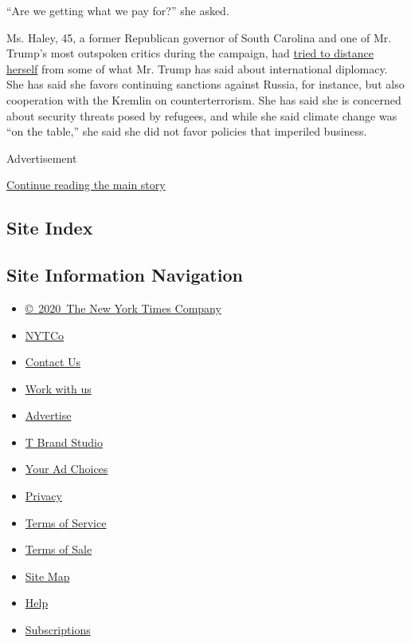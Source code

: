 ``Are we getting what we pay for?'' she asked.

Ms. Haley, 45, a former Republican governor of South Carolina and one of
Mr. Trump's most outspoken critics during the campaign, had
\href{https://www.nytimes.com/2017/01/18/us/politics/nikki-haley-un-ambassador-russia-war-crime.html}{tried
to distance herself} from some of what Mr. Trump has said about
international diplomacy. She has said she favors continuing sanctions
against Russia, for instance, but also cooperation with the Kremlin on
counterterrorism. She has said she is concerned about security threats
posed by refugees, and while she said climate change was ``on the
table,'' she said she did not favor policies that imperiled business.

Advertisement

\protect\hyperlink{after-bottom}{Continue reading the main story}

\hypertarget{site-index}{%
\subsection{Site Index}\label{site-index}}

\hypertarget{site-information-navigation}{%
\subsection{Site Information
Navigation}\label{site-information-navigation}}

\begin{itemize}
\tightlist
\item
  \href{https://help.nytimes.com/hc/en-us/articles/115014792127-Copyright-notice}{©~2020~The
  New York Times Company}
\end{itemize}

\begin{itemize}
\tightlist
\item
  \href{https://www.nytco.com/}{NYTCo}
\item
  \href{https://help.nytimes.com/hc/en-us/articles/115015385887-Contact-Us}{Contact
  Us}
\item
  \href{https://www.nytco.com/careers/}{Work with us}
\item
  \href{https://nytmediakit.com/}{Advertise}
\item
  \href{http://www.tbrandstudio.com/}{T Brand Studio}
\item
  \href{https://www.nytimes.com/privacy/cookie-policy\#how-do-i-manage-trackers}{Your
  Ad Choices}
\item
  \href{https://www.nytimes.com/privacy}{Privacy}
\item
  \href{https://help.nytimes.com/hc/en-us/articles/115014893428-Terms-of-service}{Terms
  of Service}
\item
  \href{https://help.nytimes.com/hc/en-us/articles/115014893968-Terms-of-sale}{Terms
  of Sale}
\item
  \href{https://spiderbites.nytimes.com}{Site Map}
\item
  \href{https://help.nytimes.com/hc/en-us}{Help}
\item
  \href{https://www.nytimes.com/subscription?campaignId=37WXW}{Subscriptions}
\end{itemize}
